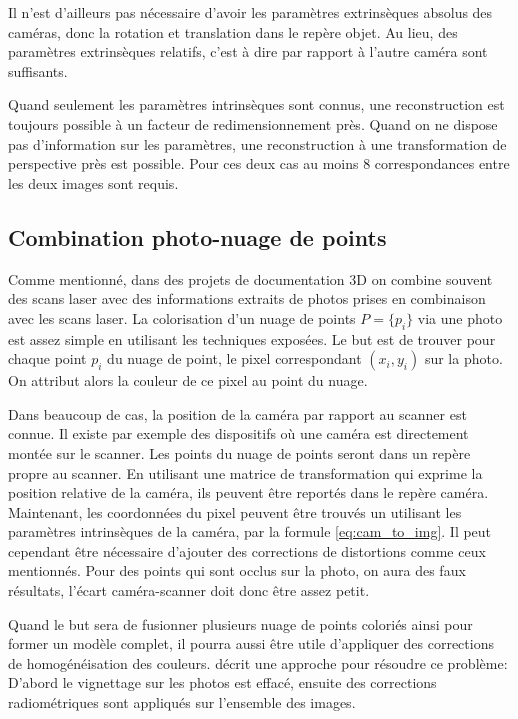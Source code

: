 \documentclass[a4paper,10pt]{scrreprt}
\begin{document}
Il n'est d'ailleurs pas nécessaire d'avoir les paramètres extrinsèques absolus des caméras, donc la rotation et translation dans le repère objet. Au lieu, des paramètres extrinsèques relatifs, c'est à dire par rapport à l'autre caméra sont suffisants.

Quand seulement les paramètres intrinsèques sont connus, une reconstruction est toujours possible à un facteur de redimensionnement près. Quand on ne dispose pas d'information sur les paramètres, une reconstruction à une transformation de perspective près est possible. Pour ces deux cas au moins $8$ correspondances entre les deux images sont requis. \cite{Truc1998}

\subsection{Combination photo-nuage de points}
Comme mentionné, dans des projets de documentation 3D on combine souvent des scans laser avec des informations extraits de photos prises en combinaison avec les scans laser. La colorisation d'un nuage de points $P = \{ p_i \}$ via une photo est assez simple en utilisant les techniques exposées. Le but est de trouver pour chaque point $p_i$ du nuage de point, le pixel correspondant $(x_i, y_i)$ sur la photo. On attribut alors la couleur de ce pixel au point du nuage.

Dans beaucoup de cas, la position de la caméra par rapport au scanner est connue. Il existe par exemple des dispositifs où une caméra est directement montée sur le scanner. Les points du nuage de points seront dans un repère propre au scanner. En utilisant une matrice de transformation qui exprime la position relative de la caméra, ils peuvent être reportés dans le repère caméra. Maintenant, les coordonnées du pixel peuvent être trouvés un utilisant les paramètres intrinsèques de la caméra, par la formule \ref{eq:cam_to_img}. Il peut cependant être nécessaire d'ajouter des corrections de distortions comme ceux mentionnés. Pour des points qui sont occlus sur la photo, on aura des faux résultats, l'écart caméra-scanner doit donc être assez petit.

Quand le but sera de fusionner plusieurs nuage de points coloriés ainsi pour former un modèle complet, il pourra aussi être utile d'appliquer des corrections de homogénéisation des couleurs. \cite{Giro2013} décrit une approche pour résoudre ce problème: D'abord le vignettage sur les photos est effacé, ensuite des corrections radiométriques sont appliqués sur l'ensemble des images.
\end{document}
